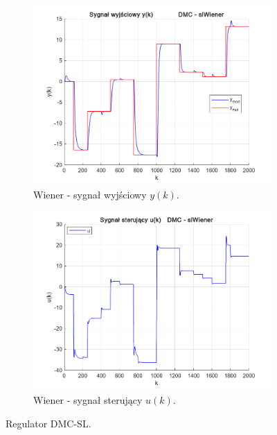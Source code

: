 \begin{figure}[b!]
\begin{subfigure}[b]{0.49\paperwidth}
\centering
\includegraphics[width=\linewidth]{pictures/y_slWiener}
\caption{Wiener - sygnał wyjściowy $y(k)$.}
\end{subfigure}
\hfill
\begin{subfigure}[b]{0.49\paperwidth}
\centering
\includegraphics[width=\linewidth]{pictures/u_slWiener}
\caption{Wiener - sygnał sterujący $u(k)$.}
\end{subfigure}

\caption{Regulator DMC-SL.}
\end{figure}

\newpage

